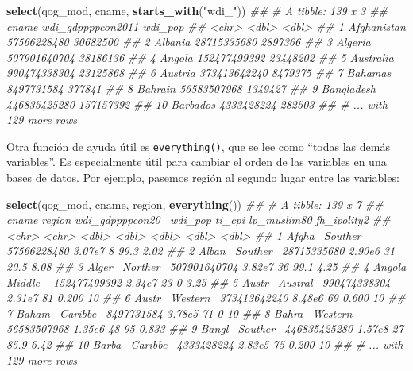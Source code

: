 \documentclass[]{book}
\newenvironment{Shaded}{\begin{snugshade}}{\end{snugshade}}
\newcommand{\CommentTok}[1]{\textcolor[rgb]{0.56,0.35,0.01}{\textit{#1}}}
\newcommand{\KeywordTok}[1]{\textcolor[rgb]{0.13,0.29,0.53}{\textbf{#1}}}
\newcommand{\NormalTok}[1]{#1}
\newcommand{\StringTok}[1]{\textcolor[rgb]{0.31,0.60,0.02}{#1}}
\begin{document}
\begin{Shaded}
\begin{Highlighting}[]
\KeywordTok{select}\NormalTok{(qog_mod, cname, }\KeywordTok{starts_with}\NormalTok{(}\StringTok{"wdi_"}\NormalTok{))}
\CommentTok{## # A tibble: 139 x 3}
\CommentTok{##    cname       wdi_gdppppcon2011   wdi_pop}
\CommentTok{##    <chr>                   <dbl>     <dbl>}
\CommentTok{##  1 Afghanistan       57566228480  30682500}
\CommentTok{##  2 Albania           28715335680   2897366}
\CommentTok{##  3 Algeria          507901640704  38186136}
\CommentTok{##  4 Angola           152477499392  23448202}
\CommentTok{##  5 Australia        990474338304  23125868}
\CommentTok{##  6 Austria          373413642240   8479375}
\CommentTok{##  7 Bahamas            8497731584    377841}
\CommentTok{##  8 Bahrain           56583507968   1349427}
\CommentTok{##  9 Bangladesh       446835425280 157157392}
\CommentTok{## 10 Barbados           4333428224    282503}
\CommentTok{## # ... with 129 more rows}
\end{Highlighting}
\end{Shaded}

Otra función de ayuda útil es \texttt{everything()}, que se lee como
``todas las demás variables''. Es especialmente útil para cambiar el
orden de las variables en una bases de datos. Por ejemplo, pasemos
región al segundo lugar entre las variables:

\begin{Shaded}
\begin{Highlighting}[]
\KeywordTok{select}\NormalTok{(qog_mod, cname, region, }\KeywordTok{everything}\NormalTok{())}
\CommentTok{## # A tibble: 139 x 7}
\CommentTok{##    cname  region   wdi_gdppppcon20~ wdi_pop ti_cpi lp_muslim80 fh_ipolity2}
\CommentTok{##    <chr>  <chr>               <dbl>   <dbl>  <dbl>       <dbl>       <dbl>}
\CommentTok{##  1 Afgha~ Souther~      57566228480  3.07e7      8      99.3         2.02 }
\CommentTok{##  2 Alban~ Souther~      28715335680  2.90e6     31      20.5         8.08 }
\CommentTok{##  3 Alger~ Norther~     507901640704  3.82e7     36      99.1         4.25 }
\CommentTok{##  4 Angola Middle ~     152477499392  2.34e7     23       0           3.25 }
\CommentTok{##  5 Austr~ Austral~     990474338304  2.31e7     81       0.200      10    }
\CommentTok{##  6 Austr~ Western~     373413642240  8.48e6     69       0.600      10    }
\CommentTok{##  7 Baham~ Caribbe~       8497731584  3.78e5     71       0          10    }
\CommentTok{##  8 Bahra~ Western~      56583507968  1.35e6     48      95           0.833}
\CommentTok{##  9 Bangl~ Souther~     446835425280  1.57e8     27      85.9         6.42 }
\CommentTok{## 10 Barba~ Caribbe~       4333428224  2.83e5     75       0.200      10    }
\CommentTok{## # ... with 129 more rows}
\end{Highlighting}
\end{Shaded}
\end{document}
